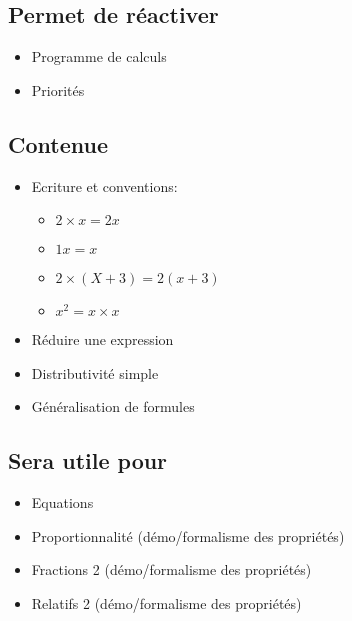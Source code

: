 \subsection{Permet de réactiver}
\begin{itemize}
    \item Programme de calculs
    \item Priorités
\end{itemize}

\subsection{Contenue}
\begin{itemize}
    \item Ecriture et conventions:
    \begin{itemize}
        \item $2\times x=2x$
        \item $1x=x$
        \item $2\times(X+3)=2(x+3)$
        \item $x^2=x\times x$
    \end{itemize}
    \item Réduire une expression
    \item Distributivité simple
    \item Généralisation de formules
\end{itemize}

\subsection{Sera utile pour}
\begin{itemize}
    \item Equations
    \item Proportionnalité (démo/formalisme des propriétés)
    \item Fractions 2 (démo/formalisme des propriétés)
    \item Relatifs 2 (démo/formalisme des propriétés)
\end{itemize}